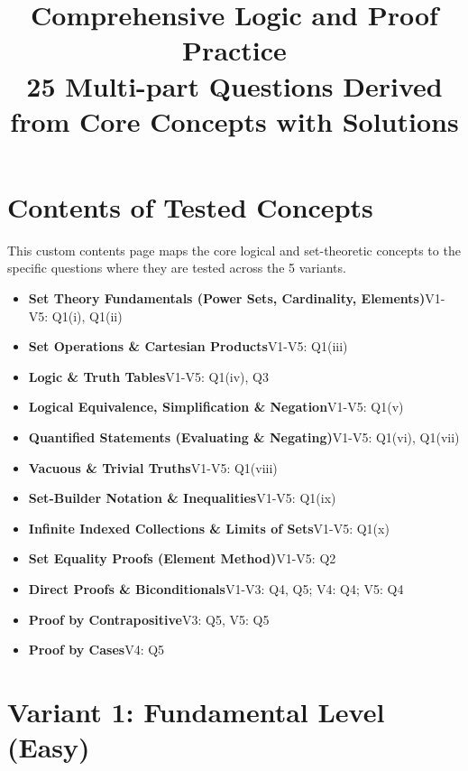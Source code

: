 \documentclass[11pt]{article}
\title{Comprehensive Logic and Proof Practice\\
\large 25 Multi-part Questions Derived from Core Concepts with Solutions}
\author{}
\date{}
\begin{document}
\maketitle

\tableofcontents

\newpage

\section*{Contents of Tested Concepts}
This custom contents page maps the core logical and set-theoretic concepts to the specific questions where they are tested across the 5 variants.

\begin{itemize}
    \item \textbf{Set Theory Fundamentals (Power Sets, Cardinality, Elements)}\dotfill V1-V5: Q1(i), Q1(ii)
    \item \textbf{Set Operations \& Cartesian Products}\dotfill V1-V5: Q1(iii)
    \item \textbf{Logic \& Truth Tables}\dotfill V1-V5: Q1(iv), Q3
    \item \textbf{Logical Equivalence, Simplification \& Negation}\dotfill V1-V5: Q1(v)
    \item \textbf{Quantified Statements (Evaluating \& Negating)}\dotfill V1-V5: Q1(vi), Q1(vii)
    \item \textbf{Vacuous \& Trivial Truths}\dotfill V1-V5: Q1(viii)
    \item \textbf{Set-Builder Notation \& Inequalities}\dotfill V1-V5: Q1(ix)
    \item \textbf{Infinite Indexed Collections \& Limits of Sets}\dotfill V1-V5: Q1(x)
    \item \textbf{Set Equality Proofs (Element Method)}\dotfill V1-V5: Q2
    \item \textbf{Direct Proofs \& Biconditionals}\dotfill V1-V3: Q4, Q5; V4: Q4; V5: Q4
    \item \textbf{Proof by Contrapositive}\dotfill V3: Q5, V5: Q5
    \item \textbf{Proof by Cases}\dotfill V4: Q5
\end{itemize}

\vspace{1cm}
\hrulefill

\newpage
\section{Variant 1: Fundamental Level (Easy)}
\end{document}
